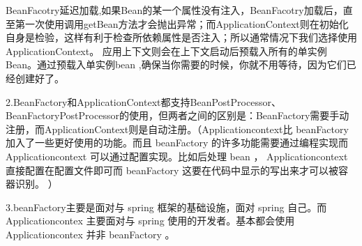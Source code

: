 \documentclass[../../../interview-questions.tex]{subfiles}
\begin{document}
BeanFacotry延迟加载,如果Bean的某一个属性没有注入，BeanFacotry加载后，直至第一次使用调用getBean方法才会抛出异常；而ApplicationContext则在初始化自身是检验，这样有利于检查所依赖属性是否注入；所以通常情况下我们选择使用 ApplicationContext。
应用上下文则会在上下文启动后预载入所有的单实例Bean。通过预载入单实例bean ,确保当你需要的时候，你就不用等待，因为它们已经创建好了。

2.BeanFactory和ApplicationContext都支持BeanPostProcessor、BeanFactoryPostProcessor的使用，但两者之间的区别是：BeanFactory需要手动注册，而ApplicationContext则是自动注册。（Applicationcontext比 beanFactory 加入了一些更好使用的功能。而且 beanFactory 的许多功能需要通过编程实现而 Applicationcontext 可以通过配置实现。比如后处理 bean ， Applicationcontext 直接配置在配置文件即可而 beanFactory 这要在代码中显示的写出来才可以被容器识别。 ）

3.beanFactory主要是面对与 spring 框架的基础设施，面对 spring 自己。而 Applicationcontex 主要面对与 spring 使用的开发者。基本都会使用 Applicationcontex 并非 beanFactory 。
\end{document}
